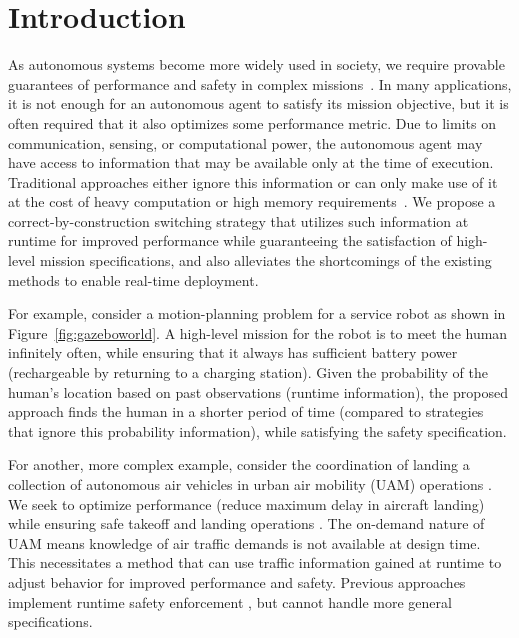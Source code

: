 

\section{Introduction}

As autonomous systems become more widely used in society, we require provable guarantees of performance and safety in complex missions~\cite{belta2007symbolic,finucane2010ltlmop}. In many applications, it is not enough for an autonomous agent to satisfy its mission objective, but it is often required that it also optimizes some performance metric. Due to limits on communication, sensing, or computational power, the autonomous agent may have access to information that may be available only at the time of execution. Traditional approaches either ignore this information or can only make use of it at the cost of heavy computation or high memory requirements~\cite{Ehlerscost,jangcontinuous}. We propose a correct-by-construction switching strategy that utilizes such information at runtime for improved performance while guaranteeing the satisfaction of high-level mission specifications, and also alleviates the shortcomings of the existing methods to enable real-time deployment. 

For example, consider a motion-planning problem for a service robot as shown in Figure~\ref{fig:gazeboworld}. A high-level mission for the robot is to meet the human infinitely often, while ensuring that it always has sufficient battery power (rechargeable by returning to a charging station). Given the probability of the human's location based on past observations (runtime information), the proposed approach finds the human in a shorter period of time (compared to strategies that ignore this probability information), while satisfying the safety specification. 

For another, more complex example, consider the coordination of landing a collection of autonomous air vehicles in urban air mobility (UAM) operations \cite{goyal2018urban,gipson2017nasa}. 
We seek to optimize performance (reduce  maximum delay in aircraft landing) while ensuring safe takeoff and landing operations \cite{thipphavong2018urban}. The on-demand nature of UAM means knowledge of air traffic demands is not available at design time. This necessitates a method that can use traffic information gained at runtime to adjust behavior for improved performance and safety. Previous approaches implement runtime safety enforcement \cite{bhnfm, AlshiekhShield,Konighofer2017,8815233}, but cannot handle more general specifications. 


